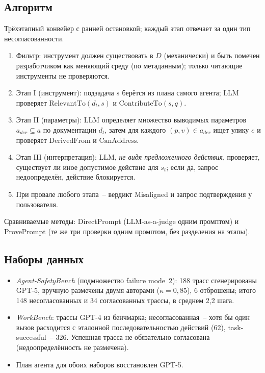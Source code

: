\subsection{Алгоритм}
Трёхэтапный конвейер с ранней остановкой; каждый этап отвечает за один тип несогласованности.
\begin{enumerate}
  \item Фильтр: инструмент должен существовать в $D$ (механически) и быть помечен
        разработчиком как меняющий среду (по метаданным); только читающие инструменты
        не проверяются.
  \item Этап I (инструмент): подзадача $s$ берётся из плана самого агента; LLM проверяет
        $\mathrm{RelevantTo}(d_t,s)$ и $\mathrm{ContributeTo}(s,q)$.
  \item Этап II (параметры): LLM определяет множество выводимых параметров $a_{der}\subseteq a$
        по документации $d_t$, затем для каждого $(p,v)\in a_{der}$ ищет улику $e$ и проверяет
        $\mathrm{DerivedFrom}$ и $\mathrm{CanAddress}$.
  \item Этап III (интерпретация): LLM, \emph{не видя предложенного действия}, проверяет,
        существует ли иное допустимое действие для $s_t$; если да, запрос недоопределён,
        действие блокируется.
  \item При провале любого этапа~-- вердикт Misaligned и запрос подтверждения у пользователя.
\end{enumerate}
Сравниваемые методы: DirectPrompt (LLM-as-a-judge одним промптом) и ProvePrompt
(те же три проверки одним промптом, без разделения на этапы).

\subsection{Наборы данных}
\begin{itemize}
  \item \emph{Agent-SafetyBench} (подмножество failure mode~2): 188 трасс сгенерированы
        GPT-5, вручную размечены двумя авторами ($\kappa=0{,}85$), 6 отброшены;
        итого 148 несогласованных и 34 согласованных трассы, в среднем 2,2 шага.
  \item \emph{WorkBench}: трассы GPT-4 из бенчмарка; несогласованная~-- хотя бы один вызов
        расходится с эталонной последовательностью действий (62), task-successful~-- 326.
        Успешная трасса не обязательно согласована (недоопределённость не размечена).
  \item План агента для обоих наборов восстановлен GPT-5.
\end{itemize}

